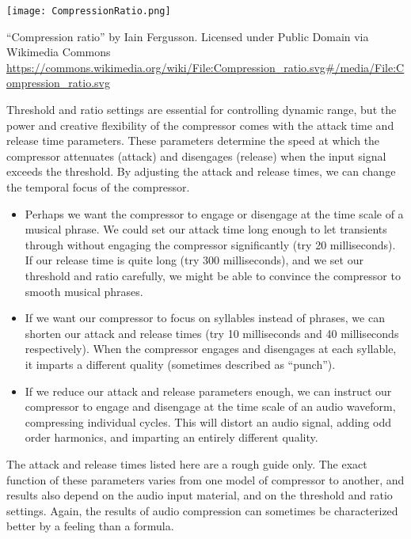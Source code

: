 \begin{marginfigure}
  \texttt{[image: CompressionRatio.png]}
  \caption{``Compression ratio'' by Iain Fergusson. Licensed under
     Public Domain via Wikimedia Commons 
     \url{https://commons.wikimedia.org/wiki/File:Compression_ratio.svg\#/media/File:Compression_ratio.svg}
   }
  \label{fig:comp-ratio}
\end{marginfigure}

Threshold and ratio settings are essential for controlling dynamic
range, but the power and creative flexibility of the compressor comes
with the attack time and release time parameters. These parameters
determine the speed at which the compressor attenuates (attack) and
disengages (release) when the input signal exceeds the threshold. By
adjusting the attack and release times, we can change the temporal
focus of the compressor.
\begin{itemize}
\item Perhaps we want the compressor to engage or disengage at the
  time scale of a musical phrase. We could set our attack time long
  enough to let transients through without engaging the compressor
  significantly (try 20 milliseconds). If our release time is quite
  long (try 300 milliseconds), and we set our threshold and ratio
  carefully, we might be able to convince the compressor to smooth
  musical phrases.
\item If we want our compressor to focus on syllables instead of
  phrases, we can shorten our attack and release times (try 10
  milliseconds and 40 milliseconds respectively). When the compressor
  engages and disengages at each syllable, it imparts a different
  quality (sometimes described as ``punch'').
\item If we reduce our attack and release parameters enough, we can
  instruct our compressor to engage and disengage at the time scale of
  an audio waveform, compressing individual cycles. This will distort
  an audio signal, adding odd order harmonics, and imparting an entirely different quality.
\end{itemize}
The attack and release times listed here are a rough guide only.  The
exact function of these parameters varies from one model of compressor
to another, and results also depend on the audio input material, and
on the threshold and ratio settings. Again, the results of audio
compression can sometimes be characterized better by a feeling than a
formula.


